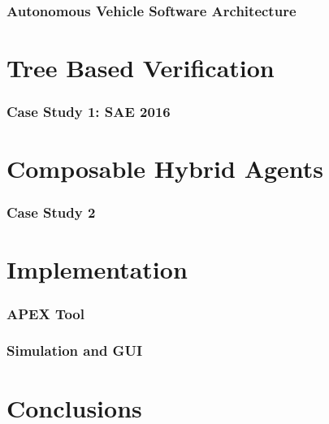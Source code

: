 \documentclass[11pt]{article}              %
\begin{document}
\section{Autonomous Vehicle Software Architecture}



\pagebreak
\part{Tree Based Verification}
\section{Case Study 1: SAE 2016}

\pagebreak
\part{Composable Hybrid Agents}
\section{Case Study 2}


\part{Implementation}
\section{APEX Tool}

\section{Simulation and GUI}

\pagebreak
\part{Conclusions}


\pagebreak


 
\end{document}
